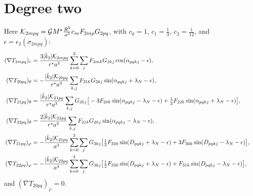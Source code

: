 \section{Degree two}
Here $\mathcal K_{2mpq}=\mathcal{G} M^\star\frac{R^5}{a^3}c_mF_{2mp}G_{2pq}$, with $c_0=1$, $c_1=\tfrac13$, $c_2=\tfrac1{12}$, and $\epsilon=\epsilon_2(\sigma_{2mpq})$:
\begin{align}
  (\nabla T_{2mpq})_r&=\frac{3|\bar k_2|\mathcal K_{2mpq}}{r^\star a^3}\sum_{k=0}^{2}\sum_jF_{2mk}G_{2kj}\cos(\alpha_{pqkj}-\epsilon),\\
  (\nabla T_{20pq})_\theta&=-\frac{|\bar k_2|\mathcal K_{20pq}}{r^\star a^3}\sum_{k,j}F_{21k}G_{2kj}\sin(\alpha_{pqkj}+\lambda_N-\epsilon),\\
  (\nabla T_{21pq})_\theta&=\frac{|\bar k_2|\mathcal K_{21pq}}{r^\star a^3}\sum_{k,j}G_{2kj}\big[-3F_{20k}\sin(\alpha_{pqkj}-\lambda_N-\epsilon)+\tfrac12F_{22k}\sin(\alpha_{pqkj}+\lambda_N-\epsilon)\big],\\
  (\nabla T_{22pq})_\theta&=\frac{2|\bar k_2|\mathcal K_{22pq}}{r^\star a^3}\sum_{k,j}F_{21k}G_{2kj}\sin(\alpha_{pqkj}-\lambda_N-\epsilon),\\
  (\nabla T_{21pq})_\varphi&=-\frac{|\bar k_2|\mathcal K_{21pq}}{a^4}\sum_{k=0}^{3}\sum_jG_{3kj}\big[\tfrac12F_{32k}\sin(D_{pqkj}+\lambda_N-\epsilon)+3F_{30k}\sin(D_{pqkj}-\lambda_N-\epsilon)\big],\\
  (\nabla T_{22pq})_\varphi&=-\frac{|\bar k_2|\mathcal K_{22pq}}{a^4}\sum_{k=0}^{3}\sum_jG_{3kj}\big[\tfrac12F_{33k}\sin(D_{pqkj}+\lambda_N-\epsilon)+F_{31k}\sin(D_{pqkj}-\lambda_N-\epsilon)\big],
\end{align}
and $(\nabla T_{20pq})_\varphi=0$.
